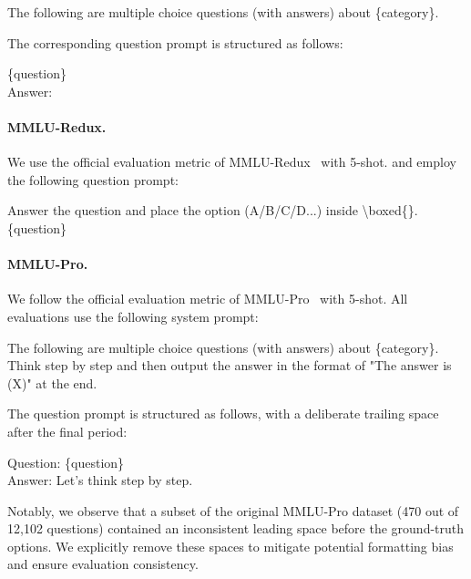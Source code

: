 \begin{MyBox}{}

    The following are multiple choice questions (with answers) about \{category\}.
\end{MyBox}

The corresponding question prompt is structured as follows:

\begin{MyBox}{}

    \{question\}\\
    Answer:
\end{MyBox}

\paragraph{MMLU-Redux.} We use the official evaluation metric of MMLU-Redux~\cite{gema2024donewithmmlu} with 5-shot. and employ the following question prompt:

\begin{MyBox}{}

    Answer the question and place the option (A/B/C/D...) inside \textbackslash boxed\{\}.\\
    \{question\}
\end{MyBox}

\paragraph{MMLU-Pro.} \label{sec:MMLU_pro_pretrain_evaluation} We follow the official evaluation metric of MMLU-Pro~\cite{wang2024mmlupro} with 5-shot. All evaluations use the following system prompt:

\begin{MyBox}{}

    The following are multiple choice questions (with answers) about \{category\}. Think step by step and then output the answer in the format of "The answer is (X)" at the end.
\end{MyBox}

The question prompt is structured as follows, with a deliberate trailing space after the final period:

\begin{MyBox}{}

    Question: \{question\}\\
    Answer: Let's think step by step.
\end{MyBox}

Notably, we observe that a subset of the original MMLU-Pro dataset (470 out of 12,102 questions) contained an inconsistent leading space before the ground-truth options. We explicitly remove these spaces to mitigate potential formatting bias and ensure evaluation consistency.


